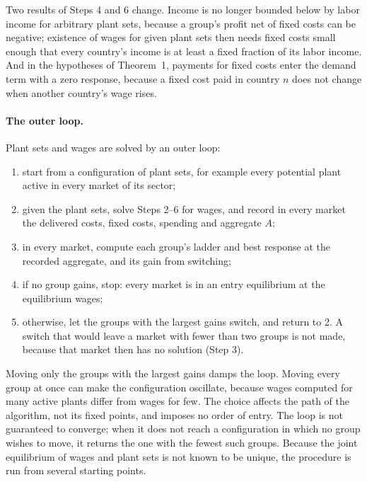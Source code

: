 \documentclass[11pt]{article}
\begin{document}
Two results of Steps 4 and 6 change. Income is no longer bounded below by labor income
for arbitrary plant sets, because a group's profit net of fixed costs can be negative;
existence of wages for given plant sets then needs fixed costs small enough that every
country's income is at least a fixed fraction of its labor income. And in the
hypotheses of Theorem~1, payments for fixed costs enter the demand term with a zero
response, because a fixed cost paid in country $n$ does not change when another
country's wage rises.

\paragraph{The outer loop.} Plant sets and wages are solved by an outer loop:
\begin{enumerate}
\item start from a configuration of plant sets, for example every potential plant
active in every market of its sector;
\item given the plant sets, solve Steps 2--6 for wages, and record in every market the
delivered costs, fixed costs, spending and aggregate $A$;
\item in every market, compute each group's ladder and best response at the recorded
aggregate, and its gain from switching;
\item if no group gains, stop: every market is in an entry equilibrium at the
equilibrium wages;
\item otherwise, let the groups with the largest gains switch, and return to 2. A switch
that would leave a market with fewer than two groups is not made, because that market
then has no solution (Step 3).
\end{enumerate}
Moving only the groups with the largest gains damps the loop. Moving every group at once
can make the configuration oscillate, because wages computed for many active plants
differ from wages for few. The choice affects the path of the algorithm, not its fixed
points, and imposes no order of entry. The loop is not guaranteed to converge; when it
does not reach a configuration in which no group wishes to move, it returns the one with
the fewest such groups. Because the joint equilibrium of wages and plant sets is not
known to be unique, the procedure is run from several starting points.
\end{document}
